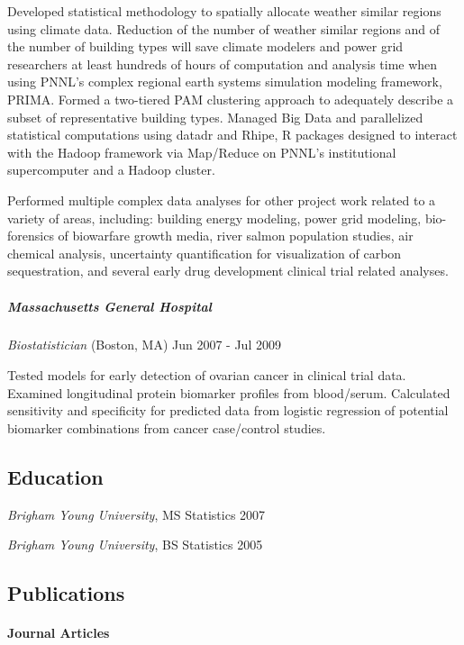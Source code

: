 \documentclass[11pt,]{article}
\let\oldparagraph\paragraph
\renewcommand{\paragraph}[1]{\oldparagraph{#1}\mbox{}}
\let\oldsubparagraph\subparagraph
\renewcommand{\subparagraph}[1]{\oldsubparagraph{#1}\mbox{}}
\begin{document}
Developed statistical methodology to spatially allocate weather similar
regions using climate data. Reduction of the number of weather similar
regions and of the number of building types will save climate modelers
and power grid researchers at least hundreds of hours of computation and
analysis time when using PNNL's complex regional earth systems
simulation modeling framework, PRIMA. Formed a two-tiered PAM clustering
approach to adequately describe a subset of representative building
types. Managed Big Data and parallelized statistical computations using
datadr and Rhipe, R packages designed to interact with the Hadoop
framework via Map/Reduce on PNNL's institutional supercomputer and a
Hadoop cluster.

Performed multiple complex data analyses for other project work related
to a variety of areas, including: building energy modeling, power grid
modeling, bio-forensics of biowarfare growth media, river salmon
population studies, air chemical analysis, uncertainty quantification
for visualization of carbon sequestration, and several early drug
development clinical trial related analyses.

\subparagraph{Massachusetts General
Hospital}\label{massachusetts-general-hospital}

\emph{Biostatistician} (Boston, MA) \hfill Jun 2007 - Jul 2009

Tested models for early detection of ovarian cancer in clinical trial
data. Examined longitudinal protein biomarker profiles from blood/serum.
Calculated sensitivity and specificity for predicted data from logistic
regression of potential biomarker combinations from cancer case/control
studies.

\subsection{Education}\label{education}

\emph{Brigham Young University}, MS Statistics \hfill 2007

\emph{Brigham Young University}, BS Statistics \hfill 2005

\subsection{Publications}\label{publications}

\paragraph{Journal Articles}\label{journal-articles}
\end{document}
